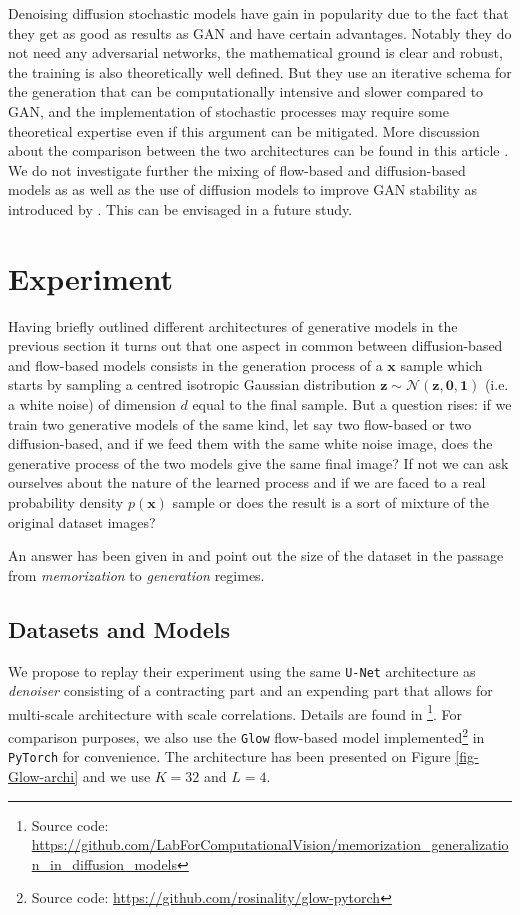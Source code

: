 \documentclass[11pt]{amsart}
\begin{document}
Denoising diffusion stochastic models have gain in popularity due to the fact that they get as good as results as GAN and have certain advantages. Notably they do not need any adversarial networks, the mathematical ground is clear and robust, the training is also theoretically well defined. But they use an iterative schema for the generation that can be computationally intensive and slower compared to GAN, and the implementation of stochastic processes may require some theoretical expertise even if this argument can be mitigated. More discussion about the comparison between the two architectures  can be found in this article \cite{dhariwal2021diffusion}. We do not investigate further the mixing of flow-based and diffusion-based models as \citep[e.g.][]{zhang2021diffusion,gong2021interpreting} as well as the use of diffusion models to improve GAN stability as introduced by \cite{Wang2022}. This can be envisaged in a future study.
%
\section{Experiment}
%
Having briefly outlined different architectures of generative models in the previous section it turns out that one aspect in common between diffusion-based and flow-based models consists in the generation process of a $\bm{x}$ sample which starts by sampling a centred isotropic Gaussian distribution $\bm{z}\sim \mathcal{N}(\bm{z},\bm{0},\bm{1})$ (i.e. a white noise) of dimension $d$ equal to the final sample. But a question rises: if we train two generative models of the same kind, let say two flow-based or two diffusion-based, and if we feed them with the same white noise image, does the generative process of the two models give the same final image? If not we can ask ourselves about the nature of the learned process and if we are faced to a real probability density $p(\bm{x})$ sample or does the result is a sort of mixture of the original dataset images? 

An answer has been given in \cite{kadkhodaie2024generalization} and point out the size of the dataset in the passage from \textit{memorization} to \textit{generation} regimes.  
%
\subsection{Datasets and Models}
%
We propose to replay their experiment using the same \texttt{U-Net} architecture \citep{2015arXiv150504597R}  as \textit{denoiser} consisting of a contracting part and an expending part that allows for multi-scale architecture with scale correlations. Details are found in \cite{kadkhodaie2024generalization}\footnote{Source code:  \url{https://github.com/LabForComputationalVision/memorization_generalization_in_diffusion_models}}. For comparison purposes, we also use the \texttt{Glow} flow-based model implemented\footnote{Source code: \url{https://github.com/rosinality/glow-pytorch}} in \texttt{PyTorch}  \citep{PyTorch2019} for convenience. The architecture has been presented on Figure \ref{fig-Glow-archi} and we use $K=32$ and $L=4$.
\end{document}
